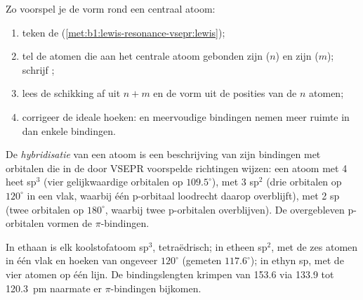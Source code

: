\begin{method}\label{met:b1:lewis-resonance-vsepr:vsepr}
Zo voorspel je de vorm rond een centraal atoom:
\begin{enumerate}
  \item teken de  (\cref{met:b1:lewis-resonance-vsepr:lewis});
  \item tel de atomen die aan het centrale atoom gebonden zijn ($n$) en
        zijn  ($m$); schrijf ;
  \item lees de schikking af uit $n + m$ en de vorm uit de posities van
        de $n$ atomen;
  \item corrigeer de ideale hoeken:  en meervoudige bindingen
        nemen meer ruimte in dan enkele bindingen.
\end{enumerate}
\end{method}

\begin{definition}[Hybridisatie]\label{def:b1:lewis-resonance-vsepr:hybridisation}
De \emph{hybridisatie} van een atoom is een
beschrijving van zijn bindingen met orbitalen die in de door VSEPR
voorspelde richtingen wijzen: een atoom met  4 heet
sp$^3$ (vier gelijkwaardige orbitalen op $109.5^\circ$), met  3 sp$^2$ (drie orbitalen op $120^\circ$ in een vlak, waarbij één
p-orbitaal loodrecht daarop overblijft), met  2 sp (twee
orbitalen op $180^\circ$, waarbij twee p-orbitalen overblijven). De
overgebleven p-orbitalen vormen de $\pi$-bindingen.
\end{definition}

\begin{example}\label{ex:b1:lewis-resonance-vsepr:carbon}
In ethaan is elk koolstofatoom sp$^3$, tetraëdrisch; in etheen sp$^2$,
met de zes atomen in één vlak en hoeken van ongeveer $120^\circ$ (gemeten
 $117.6^\circ$); in ethyn sp, met de vier atomen op één lijn.
De bindingslengten krimpen van 153.6 via 133.9 tot \qty{120.3}{pm}
naarmate er $\pi$-bindingen bijkomen.
\end{example}


